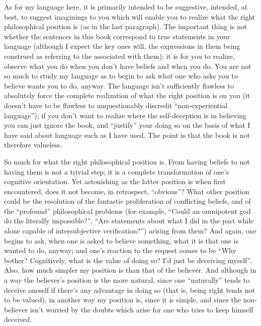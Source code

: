 As for my language here, it is primarily intended to be suggestive, 
intended, at best, to suggest imaginings to you which will enable you to 
realize what the right philosophical position is (as in the last paragraph). The 
important thing is not whether the sentences in this book correspond to true 
statements in your language (although I expect the key ones will, the 
expressions in them being construed as referring to the 
associated with them); it is for you to realize, observe what you do when 
you don't have beliefs and when you do. You are not so much to study my 
language as to begin to ask what one who asks you to believe wants you to 
do, anyway. The language isn't sufficiently flawless to absolutely force the 
complete realization of what the right position is on you (it doesn't have to 
be flawless to unquestionably discredit \enquote{non-experiential language}); if you 
don't want to realize where the self-deception is in believing you can just 
ignore the book, and \enquote{justify} your doing so on the basis of what I have said 
about language such as I have used. The point is that the book is not 
therefore valueless. 

So much for what the right philosophical position is. From having 
beliefs to not having them is not a trivial step; it is a complete 
transformation of one's cognitive orientation. Yet astonishing as the latter 
position is when first encountered, does it not become, in retrospect, 
\enquote{obvious}? What other position could be the resolution of the fantastic 
proliferation of conflicting beliefs, and of the \enquote{profound} philosophical 
problems (for example, \enquote{Could an omnipotent god do the literally 
impossible?}, \enquote{Are statements about what I did in the past while alone 
capable of intersubjective verification?}) arising from them? And again, one 
begins to ask, when one is asked to believe something, what it is that one is 
wanted to do, anyway; and one's reaction to the request comes to be \enquote{Why 
bother? Cognitively, what is the value of doing so? I'd just be deceiving 
myself}. Also, how much simpler my position is than that of the believer. 
And although in a way the believer's position is the more natural, since one 
\enquote{naturally} tends to deceive oneself if there's any advantage in doing so 
(that is, being right tends not to be valued), in another way my position is, 
since it is simple, and since the non-believer isn't worried by the doubts 
which arise for one who tries to keep himself deceived. 


